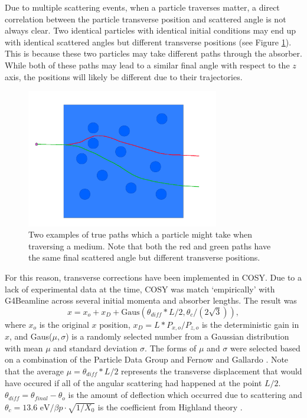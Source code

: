 %
%
\label{sec:COSYTransverseDisplacement}\par
Due to multiple scattering events, when a particle traverses matter, a direct correlation between the particle transverse position and scattered angle is not always clear. Two identical particles with identical initial conditions may end up with identical scattered angles but different transverse positions (see Figure \ref{fig:lateral_displacement}). This is because these two particles may take different paths through the absorber. While both of these paths may lead to a similar final angle with respect to the $z$ axis, the positions will likely be different due to their trajectories.

\begin{figure}
  \centering
    \includegraphics[width=0.75\textwidth]{Figures/lateral_displacement} 
  \caption[Two examples of true paths.]{Two examples of true paths which a particle might take when traversing a medium. Note that both the red and green paths have the same final scattered angle but different transverse positions.}
  \label{fig:lateral_displacement}
\end{figure}

For this reason, transverse corrections have been implemented in  COSY. Due to a lack of experimental data at the time, COSY was match `empirically' with G4Beamline across several initial momenta and absorber lengths. The result was
\begin{equation}\label{eqn:cosylatdis}
x = x_o + x_D+\text{Gaus}(\theta_\textit{diff} *L/2,\theta_c /(2\sqrt{3})),
\end{equation}
where $x_o$ is the original $x$ position, $x_D = L*P_{x,o}/P_{z,o}$ is the deterministic  gain in $x$, and Gaus($\mu,\sigma$) is a randomly selected number from a Gaussian distribution with mean $\mu$ and standard deviation $\sigma$. The forms of $\mu$ and $\sigma$ were selected based on a combination of the Particle Data Group \cite{PDG} and Fernow and Gallardo  \cite{fernowAndGallardo}. Note that the average $\mu=\theta_\textit{diff}*L/2$ represents the transverse displacement that would have occured if all of the angular scattering had happened at the point $L/2$. $\theta_\textit{diff}=\theta_\textit{final}-\theta_o$ is the amount of deflection which occurred due to scattering and $\theta_c=13.6 \text{ eV}/\beta p \cdot \sqrt{1/X_0}$ is the coefficient from Highland theory \cite{highland}.

